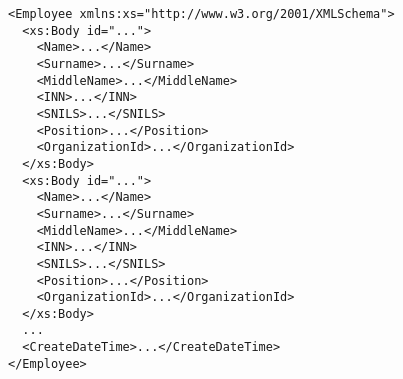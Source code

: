 

\begin{lstlisting}[style=XML,  label=lst:aggregationBinding]
<Employee xmlns:xs="http://www.w3.org/2001/XMLSchema">
  <xs:Body id="...">
    <Name>...</Name>
    <Surname>...</Surname>
    <MiddleName>...</MiddleName>
    <INN>...</INN>
    <SNILS>...</SNILS>
    <Position>...</Position>
    <OrganizationId>...</OrganizationId>
  </xs:Body>
  <xs:Body id="...">
    <Name>...</Name>
    <Surname>...</Surname>
    <MiddleName>...</MiddleName>
    <INN>...</INN>
    <SNILS>...</SNILS>
    <Position>...</Position>
    <OrganizationId>...</OrganizationId>
  </xs:Body>
  ...
  <CreateDateTime>...</CreateDateTime>
</Employee>
\end{lstlisting}